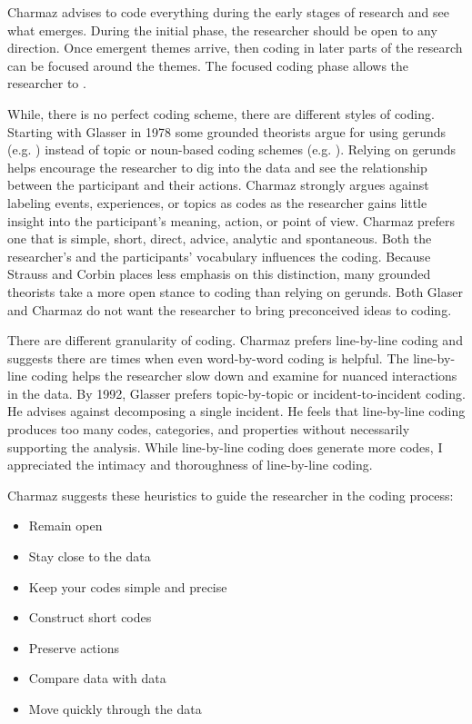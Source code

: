 Charmaz advises to code everything during the early stages of research and see what emerges. During the initial phase, the researcher should be open to any direction. Once emergent themes arrive, then coding in later parts of the research can be focused around the themes. The focused coding phase allows the researcher to  \cite{Charmaz}.

While, there is no perfect coding scheme,  there are different styles of coding. Starting with Glasser in 1978 \cite{GlaserTheoreticalSensitivity} some grounded theorists argue for using gerunds (e.g.  ) instead of topic or noun-based coding schemes (e.g.  ). Relying on gerunds helps encourage the researcher to dig into the data and see the relationship between the participant and their actions. Charmaz strongly argues against labeling events, experiences, or topics as codes as the researcher gains little insight into the participant's meaning, action, or point of view. Charmaz prefers one that is simple, short, direct, advice, analytic and spontaneous. Both the researcher's and the participants' vocabulary influences the coding. Because Strauss and Corbin \cite{Strauss1988Basics} places less emphasis on this distinction, many grounded theorists take a more open stance to coding than relying on gerunds. Both Glaser and Charmaz do not want the researcher to bring preconceived ideas to coding.

There are different granularity of coding. Charmaz prefers line-by-line coding and suggests there are times when even word-by-word coding is helpful. The line-by-line coding helps the researcher slow down and examine for nuanced interactions in the data. By 1992, Glasser prefers topic-by-topic or incident-to-incident coding. He advises against decomposing a single incident. He feels that line-by-line coding produces too many codes, categories, and properties without necessarily supporting the analysis. While line-by-line coding does generate more codes, I appreciated the intimacy and thoroughness of line-by-line coding.

Charmaz suggests these heuristics to guide the researcher in the coding process:
\begin{itemize}
\item Remain open
\item Stay close to the data
\item Keep your codes simple and precise
\item Construct short codes
\item Preserve actions
\item Compare data with data
\item Move quickly through the data \cite{Charmaz}
\end{itemize}

